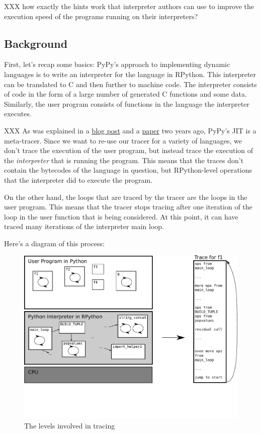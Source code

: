 \documentclass{sig-alternate}
\begin{document}
XXX how exactly
the hints work that interpreter authors can use to improve the execution speed
of the programs running on their interpreters?


\subsection{Background}

First, let's recap some basics: PyPy's approach to implementing dynamic
languages is to write an interpreter for
the language in RPython. This interpreter can be translated to C and then
further to machine code. The interpreter consists of code in the form of a
large number of generated C functions and some data. Similarly, the user
program consists of functions in the language the interpreter executes.

XXX As was explained in a \href{http://morepypy.blogspot.com/2009/03/applying-tracing-jit-to-interpreter.html}{blog post} and a \href{http://codespeak.net/svn/pypy/extradoc/talk/icooolps2009/bolz-tracing-jit.pdf}{paper} two years ago, PyPy's JIT is a
meta-tracer. Since we want to re-use our tracer for a variety of languages, we
don't trace the execution of the user program, but instead trace the execution
of the \emph{interpreter} that is running the program. This means that the traces
don't contain the bytecodes of the language in question, but RPython-level
operations that the interpreter did to execute the program.

On the other hand, the loops that are traced by the tracer are the loops in the
user program. This means that the tracer stops tracing after one iteration of
the loop in the user function that is being considered. At this point, it can
have traced many iterations of the interpreter main loop.

Here's a diagram of this process:

\begin{figure}
\includegraphics[scale=0.5]{figures/trace-levels}
\caption{The levels involved in tracing}
\label{fig:trace-levels}
\end{figure}
\end{document}
